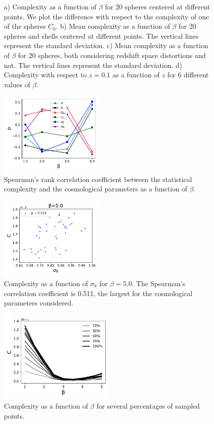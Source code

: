 \documentclass[fleqn,usenatbib]{mnras}
\begin{document}
\begin{figure}
    \caption{a) Complexity as a function of $\beta$ for 20 spheres centered at different points. We plot the difference with respect to the complexity of one of the spheres $C_0$. b) Mean complexity as a function of $\beta$ for 20 spheres and shells centered at different points. The vertical lines represent the standard deviation. c) Mean complexity as a function of $\beta$ for 20 spheres, both considering redshift space distortions and not. The vertical lines represent the standard deviation. d) Complexity with respect to $z=0.1$ as a function of $z$ for 6 different values of $\beta$.}
    \label{fig:4graf}
\end{figure}
\begin{figure}
    \centering
    \includegraphics[width=0.45\textwidth]{rhovb.pdf}
\caption{Spearman's rank correlation coefficient between the statistical complexity and the cosmological parameters as a function of $\beta$.}
    \label{fig:rhovb}
\end{figure}
\begin{figure}
    \centering
    \includegraphics[width=0.45\textwidth]{cvsigma8.pdf}
    \caption{Complexity as a function of $\sigma_{8}$ for $\beta=5.0$. The Spearman's correlation coefficient is 0.511, the largest for the cosmological parameters considered.}
    \label{fig:cvsigma8}
\end{figure}

\begin{figure}
    \centering
    \includegraphics[width=0.5\textwidth]{cvb_porc.pdf}
    \caption{Complexity as a function of $\beta$ for several percentages of sampled points.}
    \label{fig:cvb_porcentaje}
\end{figure}
\end{document}
